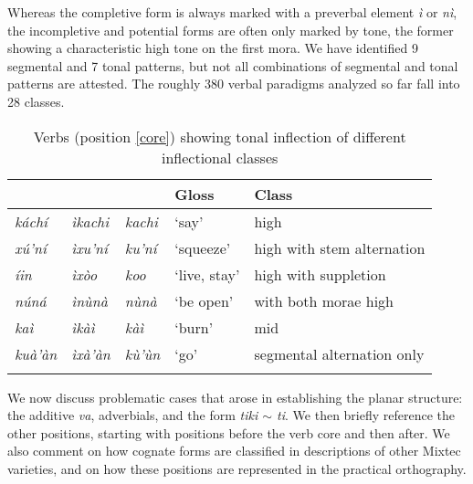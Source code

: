\documentclass[output=paper]{langscibook}
\begin{document}
Whereas the completive form is always marked with a preverbal element \emph{ì} or \textit{nì}, the incompletive and potential forms are often only marked by tone, the former showing a characteristic high tone on the first mora. 
We have identified 9 segmental and 7 tonal patterns, but not all combinations of segmental and tonal patterns are attested. The roughly 380 verbal paradigms analyzed so far fall into 28 classes.

\begin{table}
	\caption{Verbs (position \ref{core}) showing tonal inflection of different inflectional classes}
	\label{tab:classes}
	\begin{tabular}{lllll} \lsptoprule
		\Incmpl{}                & \Cmpl{}              & \Pot{}               & Gloss & Class \\ \midrule
		\textit{káchí} 		& \textit{ìkachi} 	& \textit{kachi}	& `say'  		& \Incmpl{} high \\
		\textit{xú'ní}      & \textit{ìxu'ní} 	& \textit{ku'ní} 	& `squeeze' 	& \Incmpl{} high with stem alternation \\ 
		\textit{íin}	 	& \textit{ìxòo} 	& \textit{koo}	 	& `live, stay' 	& \Incmpl{} high with suppletion \\
		\textit{núná} 		& \textit{ìnùnà} 	& \textit{nùnà} 	& `be open' 	& \Incmpl{} with both morae high \\
		\textit{kaì}  		& \textit{ìkàì}  	& \textit{kàì}  	& `burn'    	& \Incmpl{} mid \\
		\textit{kuà'àn}	 	& \textit{ìxà'àn}	& \textit{kù'ùn} 	& `go' 			& segmental alternation only \\
		\lspbottomrule
	\end{tabular}
\end{table}


We now discuss problematic cases that arose in establishing the planar structure: the additive \textit{va}, adverbials, and the form \textit{tiki $\sim$ ti}. We then briefly reference the other positions, starting with positions before the verb core and then after.
We also comment on how cognate forms are classified in descriptions of other Mixtec varieties, and on how these positions are represented in the practical orthography.
\end{document}
